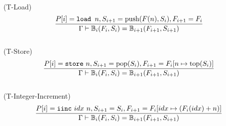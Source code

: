 \documentclass{amsart}
\newcommand{\bB}{\mathbb{B}}
\numberwithin{equation}{section}
\theoremstyle{plain} %
\theoremstyle{definition}
\theoremstyle{remark}
\begin{document}
\\
(T-Load)
\begin{equation*}
\frac{P[i] = \text{\texttt{load }} n, S_{i+1} = \text{push}(F(n), S_i), F_{i+1} = F_i}
{\Gamma \vdash \bB{}_i(F_i, S_i) = \bB{}_{i+1}(F_{i+1}, S_{i+1})}
\end{equation*}
\\
(T-Store)
\begin{equation*}
\frac{P[i] = \text{\texttt{store} } n, S_{i+1} = \text{pop}(S_i), F_{i+1} = F_i[n \mapsto \text{top}(S_i)]}
{\Gamma \vdash \bB{}_i(F_i, S_i) = \bB{}_{i+1}(F_{i+1}, S_{i+1})}
\end{equation*}
\\
(T-Integer-Increment)
\begin{equation*}
\frac{P[i] = \text{\texttt{iinc} } idx~n, S_{i+1} = S_i,
F_{i+1} = F_i[idx \mapsto (F_i(idx) + n)]}
{\Gamma \vdash \bB{}_i(F_i, S_i) = \bB{}_{i+1}(F_{i+1},S_{i+1})}
\end{equation*}
\end{document}
